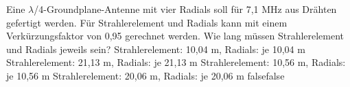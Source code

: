     {Eine $\lambda$/4-Groundplane-Antenne mit vier Radials soll für 7,1 MHz aus Drähten gefertigt werden. Für Strahlerelement und Radials kann mit einem Verkürzungsfaktor von 0,95 gerechnet werden. Wie lang müssen Strahlerelement und Radials jeweils sein?}
    {Strahlerelement: 10,04 m, Radials: je 10,04 m}
    {Strahlerelement: 21,13 m, Radials: je 21,13 m}
    {Strahlerelement: 10,56 m, Radials: je 10,56 m}
    {Strahlerelement: 20,06 m, Radials: je 20,06 m}
    {false}{false}